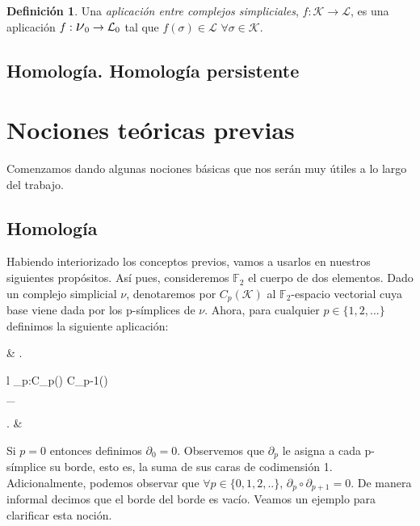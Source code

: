 \documentclass[12pt]{article}
\numberwithin{equation}{section}
\theoremstyle{definition}
\newtheorem{defi}{Definición}
\theoremstyle{remark}
\theoremstyle{plain}
\begin{document}
	\begin{defi}
		Una \textit{aplicación entre complejos simpliciales}, 
		$f:\mathcal{K} \rightarrow \mathcal{L}$, es una aplicación 
		$f:\text{{\Large $\nu$}$_{0}$} \rightarrow \mathcal{L}_{0}$ tal
		que $f(\sigma) \in \mathcal{L} \hspace{4pt} \forall \sigma \in \mathcal{K}$.
	\end{defi}
	


	\subsection{Homología. Homología persistente}
	
	\section{Nociones teóricas previas}
	
		Comenzamos dando algunas nociones básicas que nos serán muy útiles a lo largo del trabajo.
			
	\subsection{Homología}	

		Habiendo interiorizado los conceptos previos, vamos a usarlos en nuestros siguientes propósitos. Así pues, consideremos $\mathbb{F}_{2}$ el cuerpo de dos elementos. Dado un
		complejo simplicial {\Large $\nu$}, denotaremos por $C_{p}(\mathcal{K})$ al $\mathbb{F}_{2}$-espacio vectorial cuya base viene dada por los p-símplices de {\Large $\nu$}. Ahora,
		para cualquier $p \in \{1,2,...\}$ definimos la siguiente aplicación: 
		\begin{flalign*}
			& \left.
			\begin{array}{l}
				\partial_{p}:C_{p}() \rightarrow C_{p-1}()\\[2pt] 
				\hspace{1.5cm} \sigma \mapsto \displaystyle \sum_{}\tau
			\end{array}
			\right. &
		\end{flalign*}
		
		Si $p=0$ entonces definimos $\partial_{0}=0$. Observemos que $\partial_{p}$ le asigna a cada p-símplice su borde, esto es, la suma de sus caras de codimensión 1. Adicionalmente, podemos
		observar que $\forall p \in \{0,1,2,..\}$, $\partial_{p}\circ \partial_{p+1}=0$. De manera informal decimos que el borde del borde es vacío. Veamos un ejemplo para clarificar esta noción.
\end{document}
